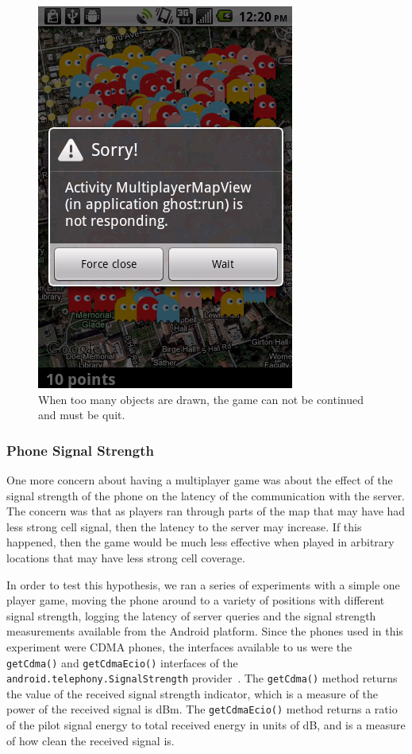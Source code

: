 \documentclass{acm_proc_article-sp}
\newcommand{\javaCode}[1]{\texttt{#1}}
\begin{document}
\begin{figure}
\centering
\includegraphics[scale=0.45]{screenshots/sorry}
\caption{When too many objects are drawn, the game can not be continued and must be quit.}
\label{fig:256GhostsSorry}
\end{figure}

\subsubsection{Phone Signal Strength}
One more concern about having a multiplayer game was about the effect of the
signal strength of the phone on the latency of the communication with the
server. The concern was that as players ran through parts of the map that
may have had less strong cell signal, then the latency to the server may
increase. If this happened, then the game would be much less effective when
played in arbitrary locations that may have less strong cell coverage.

In order to test this hypothesis, we ran a series of experiments with a simple
one player game, moving the phone around to a variety of positions with
different signal strength, logging the latency of server queries and the
signal strength measurements available from the Android platform. Since the
phones used in this experiment were CDMA phones, the interfaces available
%
%
%
to us were the \javaCode{getCdma()} and \javaCode{getCdmaEcio()} interfaces
of the \javaCode{android.telephony.SignalStrength}
provider~\cite{SignalStrengthAndroidDocs}.
The \javaCode{getCdma()} method returns the value of the received
signal strength indicator, which is a measure of the power of the received
signal is dBm.
The \javaCode{getCdmaEcio()} method returns a ratio of the pilot signal energy
to total received energy in units of dB, and is a measure of how clean the
received signal is.
\end{document}
